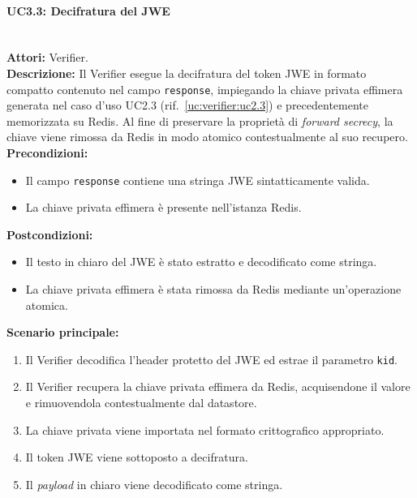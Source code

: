 \paragraph{\large\bfseries UC3.3: Decifratura del JWE}
\label{uc:verifier:uc3.3}
\mbox{}\\
\noindent\textbf{Attori:} Verifier.
\\
\noindent\textbf{Descrizione:} Il Verifier esegue la decifratura del token JWE in formato compatto contenuto nel campo \texttt{response}, impiegando la chiave privata effimera generata nel caso d'uso UC2.3 (rif.\ \ref{uc:verifier:uc2.3}) e precedentemente memorizzata su Redis. Al fine di preservare la proprietà di \textit{forward secrecy}, la chiave viene rimossa da Redis in modo atomico contestualmente al suo recupero.
\\
\noindent\textbf{Precondizioni:}
\begin{itemize}
    \item Il campo \texttt{response} contiene una stringa JWE sintatticamente valida.
    \item La chiave privata effimera è presente nell'istanza Redis.
\end{itemize}
\noindent\textbf{Postcondizioni:}
\begin{itemize}
    \item Il testo in chiaro del JWE è stato estratto e decodificato come stringa.
    \item La chiave privata effimera è stata rimossa da Redis mediante un'operazione atomica.
\end{itemize}

\noindent\textbf{Scenario principale:}
\begin{enumerate}
    \item Il Verifier decodifica l'header protetto del JWE ed estrae il parametro \texttt{kid}.
    \item Il Verifier recupera la chiave privata effimera da Redis, acquisendone il valore e rimuovendola contestualmente dal datastore.
    \item La chiave privata viene importata nel formato crittografico appropriato.
    \item Il token JWE viene sottoposto a decifratura.
    \item Il \textit{payload} in chiaro viene decodificato come stringa.
\end{enumerate}

